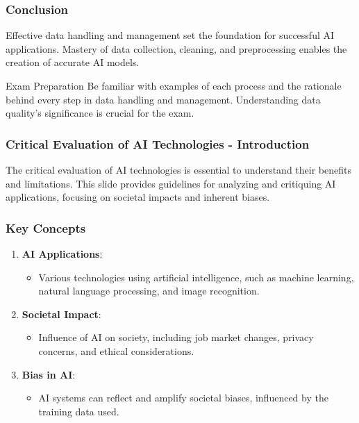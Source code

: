 \documentclass[aspectratio=169]{beamer}
\begin{document}
\begin{frame}
    \frametitle{Conclusion}
    Effective data handling and management set the foundation for successful AI applications. Mastery of data collection, cleaning, and preprocessing enables the creation of accurate AI models.
    
    \begin{block}{Exam Preparation}
        Be familiar with examples of each process and the rationale behind every step in data handling and management. Understanding data quality's significance is crucial for the exam.
    \end{block}
\end{frame}

\begin{frame}[fragile]
    \frametitle{Critical Evaluation of AI Technologies - Introduction}
    The critical evaluation of AI technologies is essential to understand their benefits and limitations. This slide provides guidelines for analyzing and critiquing AI applications, focusing on societal impacts and inherent biases.
\end{frame}

\begin{frame}[fragile]
    \frametitle{Key Concepts}
    \begin{enumerate}
        \item \textbf{AI Applications}:
        \begin{itemize}
            \item Various technologies using artificial intelligence, such as machine learning, natural language processing, and image recognition.
        \end{itemize}

        \item \textbf{Societal Impact}:
        \begin{itemize}
            \item Influence of AI on society, including job market changes, privacy concerns, and ethical considerations.
        \end{itemize}

        \item \textbf{Bias in AI}:
        \begin{itemize}
            \item AI systems can reflect and amplify societal biases, influenced by the training data used.
        \end{itemize}
    \end{enumerate}
\end{frame}
\end{document}
